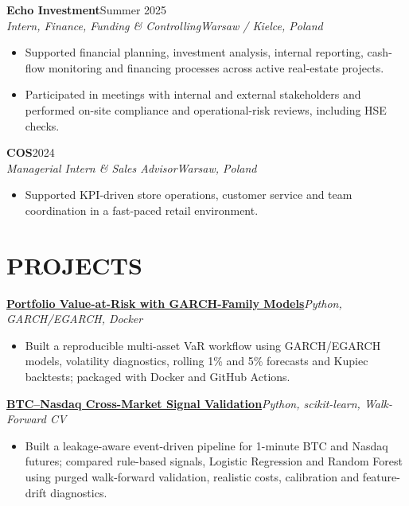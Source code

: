\documentclass[10pt,a4paper]{article}
\newcommand{\entry}[4]{%
  \textbf{#1}\hfill #2\\[-1pt]
  \textit{#3}\hfill \textit{#4}\vspace{-2pt}
}
\newcommand{\project}[3]{%
  \href{#1}{\textbf{#2}}\hfill \textit{#3}\vspace{-2pt}
}
\begin{document}
\entry{Echo Investment}{Summer 2025}{Intern, Finance, Funding \& Controlling}{Warsaw / Kielce, Poland}
\begin{itemize}
  \item Supported financial planning, investment analysis, internal reporting, cash-flow monitoring and financing processes across active real-estate projects.
  \item Participated in meetings with internal and external stakeholders and performed on-site compliance and operational-risk reviews, including HSE checks.
\end{itemize}

\entry{COS}{2024}{Managerial Intern \& Sales Advisor}{Warsaw, Poland}
\begin{itemize}
  \item Supported KPI-driven store operations, customer service and team coordination in a fast-paced retail environment.
\end{itemize}

\section{PROJECTS}
\project{https://github.com/cliprob/Garch-VaR-Portfolio-Risk}{Portfolio Value-at-Risk with GARCH-Family Models}{Python, GARCH/EGARCH, Docker}
\begin{itemize}
  \item Built a reproducible multi-asset VaR workflow using GARCH/EGARCH models, volatility diagnostics, rolling 1\% and 5\% forecasts and Kupiec backtests; packaged with Docker and GitHub Actions.
\end{itemize}

\project{https://github.com/cliprob/BTC-NQ-Cross-Market-Validation}{BTC--Nasdaq Cross-Market Signal Validation}{Python, scikit-learn, Walk-Forward CV}
\begin{itemize}
  \item Built a leakage-aware event-driven pipeline for 1-minute BTC and Nasdaq futures; compared rule-based signals, Logistic Regression and Random Forest using purged walk-forward validation, realistic costs, calibration and feature-drift diagnostics.
\end{itemize}
\end{document}
